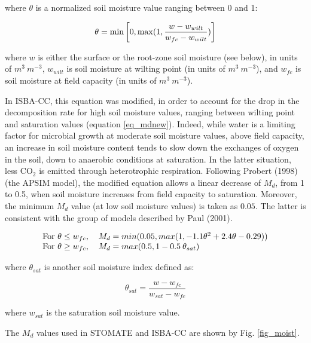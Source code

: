{where $\theta$ is a normalized soil moisture value ranging between 0 and 1: 

\begin{equation}
\theta = {\rm min} \left[ 0, {\rm max}(1, \frac{w-w_{wilt}}{w_{fc}-w_{wilt}})\right]
\end{equation}

where $w$ is either the surface or the root-zone soil moisture (see below), in units of $m^3 \: m^{-3}$,
$w_{wilt}$ is soil moisture at wilting point (in units of $m^3 \: m^{-3}$),
and $w_{fc}$ is soil moisture at field capacity (in units of $m^3 \: m^{-3}$).


In ISBA-CC, this equation was modified, in order to account for the 
drop in the decomposition rate for high soil moisture values, ranging between 
wilting point and saturation values (equation \ref{eq_mdnew}). 
Indeed, while water is a limiting factor for microbial growth at moderate soil moisture 
values, above field capacity, an increase in soil moisture content tends to slow down 
the exchanges of oxygen in the soil, down to anaerobic conditions at saturation. 
In the latter situation, less CO$_2$ is emitted through heterotrophic respiration.
Following Probert \etal (1998)\nocite{Probert1998} (the APSIM model), the modified equation allows 
a linear decrease of $M_d$, from 1 to 0.5, when soil moisture increases 
from field capacity to saturation.
Moreover, the minimum $M_d$ value (at low soil moisture values) is taken as $0.05$. 
The latter is consistent with the group of models described by Paul (2001)\nocite{Paul2001}.

\begin{equation}
\begin{tabular}{ll}
For $\theta \le w_{fc}$, & $M_d = min(0.05, max(1, -1.1 \theta^2 + 2.4 \theta - 0.29))$ \\
For $\theta \ge w_{fc}$, & $M_d = max(0.5, 1 - 0.5 \: \theta_{sat})$ \\
\label{eq_mdnew}
\end{tabular}
\end{equation}

where $\theta_{sat}$ is another soil moisture index defined as: 

\begin{equation}
\theta_{sat} = \frac{w-w_{fc}}{w_{sat}-w_{fc}}
\end{equation}

where $w_{sat}$ is the saturation soil moisture value.

The $M_d$ values used in STOMATE and ISBA-CC are shown by Fig. \ref{fig_moist}.


}

